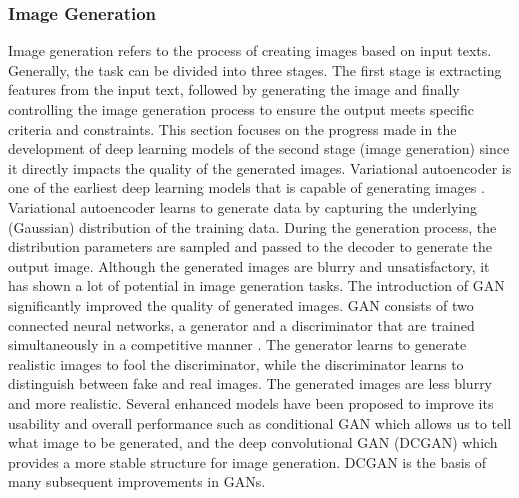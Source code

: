 \documentclass[preprint,12pt]{elsarticle}
\begin{document}
\subsubsection{Image Generation}
Image generation refers to the process of creating images based on input texts. Generally, the task can be divided into three stages. The first stage is extracting features from the input text, followed by generating the image and finally controlling the image generation process to ensure the output meets specific criteria and constraints. This section focuses on the progress made in the development of deep learning models of the second stage (image generation) since it directly impacts the quality of the generated images. Variational autoencoder is one of the earliest deep learning models that is capable of generating images \citep{kingma_auto-encoding_2013}. Variational autoencoder learns to generate data by capturing the underlying (Gaussian) distribution of the training data. During the generation process, the distribution parameters are sampled and passed to the decoder to generate the output image. Although the generated images are blurry and unsatisfactory, it has shown a lot of potential in image generation tasks. The introduction of GAN significantly improved the quality of generated images. GAN consists of two connected neural networks, a generator and a discriminator that are trained simultaneously in a competitive manner \citep{goodfellow_generative_2014}. The generator learns to generate realistic images to fool the discriminator, while the discriminator learns to distinguish between fake and real images. The generated images are less blurry and more realistic. Several enhanced models have been proposed to improve its usability and overall performance such as conditional GAN \citep{odena_conditional_2017} which allows us to tell what image to be generated, and the deep convolutional GAN (DCGAN) \citep{radford_unsupervised_2015} which provides a more stable structure for image generation. DCGAN is the basis of many subsequent improvements in GANs.
\end{document}
